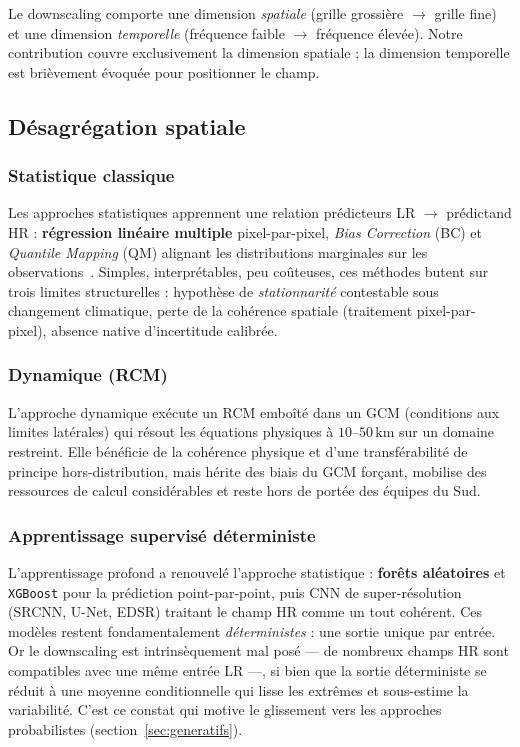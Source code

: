 \documentclass[14pt,a4paper,openany]{extreport}
\theoremstyle{definition}
\begin{document}
Le downscaling comporte une dimension \emph{spatiale} (grille grossière $\to$ grille fine) et une dimension \emph{temporelle} (fréquence faible $\to$ fréquence élevée). Notre contribution couvre exclusivement la dimension spatiale ; la dimension temporelle est brièvement évoquée pour positionner le champ.

\subsection{Désagrégation spatiale}
\label{ssec:disagg-spatiale}

\subsubsection{Statistique classique}

Les approches statistiques apprennent une relation prédicteurs LR $\to$ prédictand HR : \textbf{régression linéaire multiple} pixel-par-pixel, \emph{Bias Correction} (BC) et \emph{Quantile Mapping} (QM) alignant les distributions marginales sur les observations~\cite{wilby_wigley_1997,maraun_widmann_2018}. Simples, interprétables, peu coûteuses, ces méthodes butent sur trois limites structurelles : hypothèse de \emph{stationnarité} contestable sous changement climatique, perte de la cohérence spatiale (traitement pixel-par-pixel), absence native d'incertitude calibrée.

\subsubsection{Dynamique (RCM)}

L'approche dynamique exécute un RCM emboîté dans un GCM (conditions aux limites latérales) qui résout les équations physiques à $10$--$50\,\mathrm{km}$ sur un domaine restreint. Elle bénéficie de la cohérence physique et d'une transférabilité de principe hors-distribution, mais hérite des biais du GCM forçant, mobilise des ressources de calcul considérables et reste hors de portée des équipes du Sud.

\subsubsection{Apprentissage supervisé déterministe}

L'apprentissage profond a renouvelé l'approche statistique : \textbf{forêts aléatoires} et \texttt{XGBoost} pour la prédiction point-par-point, puis CNN de super-résolution (SRCNN, U-Net, EDSR) traitant le champ HR comme un tout cohérent. Ces modèles restent fondamentalement \emph{déterministes} : une sortie unique par entrée. Or le downscaling est intrinsèquement mal posé --- de nombreux champs HR sont compatibles avec une même entrée LR ---, si bien que la sortie déterministe se réduit à une moyenne conditionnelle qui lisse les extrêmes et sous-estime la variabilité. C'est ce constat qui motive le glissement vers les approches probabilistes (section~\ref{sec:generatifs}).
\end{document}
